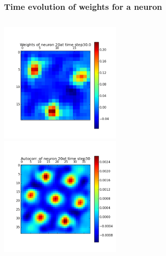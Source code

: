 \begin{frame}
\frametitle{Time evolution of weights for a neuron}
\begin{columns}[t]
\centering
\includegraphics[width=6cm,height=6cm]{neurons/neuron_w_20_t_30.png}\\
\centering
\includegraphics[width=6cm,height=6cm]{neurons/neuron_a_20_t_30.png}\\
\end{columns}
\end{frame}


